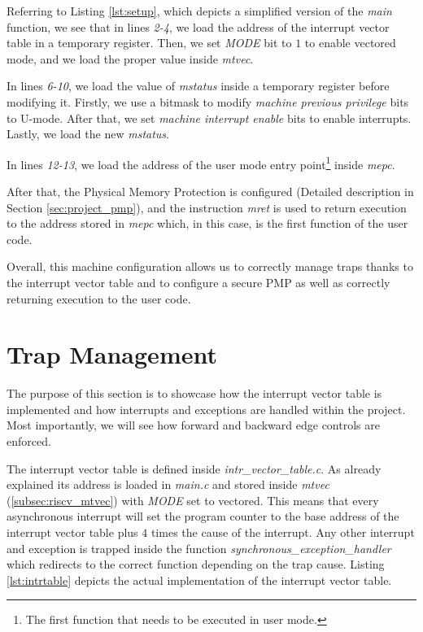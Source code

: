 Referring to Listing \ref{lst:setup}, which depicts a simplified version of the
\textit{main} function, we see that in lines \textit{2-4}, we load the address
of the interrupt vector table in a temporary register. Then, we set \textit{MODE}
bit to $1$ to enable vectored mode, and we load the proper value inside \textit{mtvec}.

In lines \textit{6-10}, we load the value of \textit{mstatus} inside a temporary
register before modifying it. Firstly, we use a bitmask to modify \textit{machine
previous privilege} bits to U-mode. After that, we set \textit{machine interrupt
enable} bits to enable interrupts. Lastly, we load the new \textit{mstatus}.

In lines \textit{12-13}, we load the address of the user mode entry point\footnote{The
first function that needs to be executed in user mode.} inside \textit{mepc}.

After that, the Physical Memory Protection is configured (Detailed description in
Section \ref{sec:project_pmp}), and the instruction \textit{mret} is used to
return execution to the address stored in \textit{mepc} which, in this case, is the
first function of the user code.

Overall, this machine configuration allows us to correctly manage traps thanks
to the interrupt vector table and to configure a secure PMP as well as correctly
returning execution to the user code.

\section{Trap Management}
\label{sec:project_isr}

The purpose of this section is to showcase how the interrupt vector table is implemented
and how interrupts and exceptions are handled within the project. Most
importantly, we will see how forward and backward edge controls are enforced.

The interrupt vector table is defined inside \textit{intr\_vector\_table.c}. As already
explained its address is loaded in \textit{main.c} and stored inside \textit{mtvec}
(\ref{subsec:riscv_mtvec}) with \textit{MODE} set to vectored. This means that every
asynchronous interrupt will set the program counter to the base address of the interrupt
vector table plus $4$ times the cause of the interrupt. Any other interrupt and
exception is trapped inside the function \textit{synchronous\_exception\_handler}
which redirects to the correct function depending on the trap cause. Listing
\ref{lst:intrtable} depicts the actual implementation of the interrupt vector
table.

